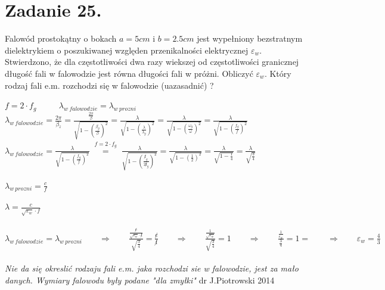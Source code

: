 \section*{Zadanie 25.}
\begin{task}
Falowód prostokątny o bokach $a = 5 cm$ i $b = 2.5 cm$ jest wypełniony bezstratnym dielektrykiem o poszukiwanej względen przenikalności elektrycznej $\varepsilon_w$. Stwierdzono, że dla częstotliwości dwa razy wiekszej od częstotliwości granicznej długość fali w falowodzie jest równa długości fali w próżni. Obliczyć $\varepsilon_w$. Który rodzaj fali e.m. rozchodzi się w falowodzie (uazasadnić) ?
\end{task}

\begin{solution}

$f = 2 \cdot f_g$ $\qquad$
$\lambda_{w \ falowodzie} = \lambda_{w \ prozni}$ \\
$\lambda_{w \ falowodzie} = \frac{2 \pi}{\beta_z} = \frac{\frac{2 \pi}{\beta}}{\sqrt{1-(\frac{\beta_g}{\beta})^2}} =  \frac{\lambda}{\sqrt{1-(\frac{\lambda}{\lambda_g})^2}} = \frac{\lambda}{\sqrt{1-(\frac{\omega_g}{\omega})^2}} = \frac{\lambda}{\sqrt{1-(\frac{f_g}{f})^2}}$ \\
$\lambda_{w \ falowodzie} =  \frac{\lambda}{\sqrt{1-(\frac{f_g}{f})^2}} \stackrel{\substack{f = 2 \cdot f_g}}{=} \frac{\lambda}{\sqrt{1-(\frac{\not f_g}{2 \not f_g})^2}} = \frac{\lambda}{\sqrt{1-(\frac{1}{2})^2}} = \frac{\lambda}{\sqrt{1-\frac{1}{4}}} = \frac{\lambda}{\sqrt{\frac{3}{4}}}$ \\ \\
$\lambda_{w \ prozni} = \frac{c}{f}$ \\ \\
$\lambda = \frac{c}{\sqrt{\varepsilon_w} \cdot f}$ \\ \\
$\lambda_{w \ falowodzie} = \lambda_{w \ prozni} \qquad \Rightarrow \qquad  \frac{\frac{\not c}{\sqrt{\varepsilon_w} \cdot \not f}}{\sqrt{\frac{3}{4}}} = \frac{\not c}{\not f} \qquad \Rightarrow \qquad \frac{\frac{1}{\sqrt{\varepsilon_w} }}{\sqrt{\frac{3}{4}}} = 1 \qquad \Rightarrow \qquad \frac{\frac{1}{\varepsilon_w }}{\frac{3}{4}} = 1 = \qquad \Rightarrow \qquad \varepsilon_w  = {\frac{4}{3}} $ \\ \\

\textit {Nie da się okreslić rodzaju fali e.m. jaka rozchodzi sie w falowodzie, jest za mało danych. Wymiary falowodu były podane "dla zmyłki"}  dr J.Piotrowski 2014


\end{solution}